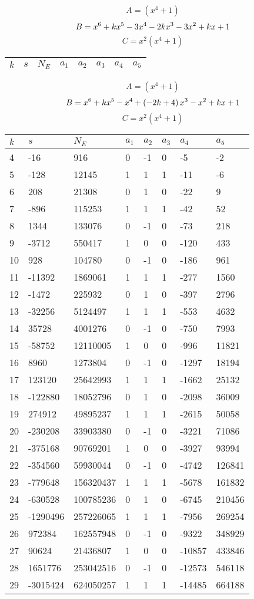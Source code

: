 \documentclass{amsart}
\begin{document}
$$A=(x^4
 + 1)$$
$$B=x^6
 + k\*x^5
 - 3\*x^4
 - 2\*k\*x^3
 - 3\*x^2
 + k\*x
 + 1$$
$$C=x^2(x^4
 + 1)$$
\begin{longtable}{|l|l|l|lllll|}
\hline
$k$ & $s$ & $N_E$ & $a_1$ & $a_2$ & $a_3$ & $a_4$ & $a_5$\\
\hline
\hline
\end{longtable}
$$A=(x^4
 + 1)$$
$$B=x^6
 + k\*x^5
 - x^4
 + \left(-2\*k
 + 4\right) \*x^3
 - x^2
 + k\*x
 + 1$$
$$C=x^2(x^4
 + 1)$$
\begin{longtable}{|l|l|l|lllll|}
\hline
$k$ & $s$ & $N_E$ & $a_1$ & $a_2$ & $a_3$ & $a_4$ & $a_5$\\
\hline
4&-16&916&0&-1&0&-5&-2\\
5&-128&12145&1&1&1&-11&-6\\
6&208&21308&0&1&0&-22&9\\
7&-896&115253&1&1&1&-42&52\\
8&1344&133076&0&-1&0&-73&218\\
9&-3712&550417&1&0&0&-120&433\\
10&928&104780&0&-1&0&-186&961\\
11&-11392&1869061&1&1&1&-277&1560\\
12&-1472&225932&0&1&0&-397&2796\\
13&-32256&5124497&1&1&1&-553&4632\\
14&35728&4001276&0&-1&0&-750&7993\\
15&-58752&12110005&1&0&0&-996&11821\\
16&8960&1273804&0&-1&0&-1297&18194\\
17&123120&25642993&1&1&1&-1662&25132\\
18&-122880&18052796&0&1&0&-2098&36009\\
19&274912&49895237&1&1&1&-2615&50058\\
20&-230208&33903380&0&-1&0&-3221&71086\\
21&-375168&90769201&1&0&0&-3927&93994\\
22&-354560&59930044&0&-1&0&-4742&126841\\
23&-779648&156320437&1&1&1&-5678&161832\\
24&-630528&100785236&0&1&0&-6745&210456\\
25&-1290496&257226065&1&1&1&-7956&269254\\
26&972384&162557948&0&-1&0&-9322&348929\\
27&90624&21436807&1&0&0&-10857&433846\\
28&1651776&253042516&0&-1&0&-12573&546118\\
29&-3015424&624050257&1&1&1&-14485&664188\\

\end{longtable}
\end{document}
